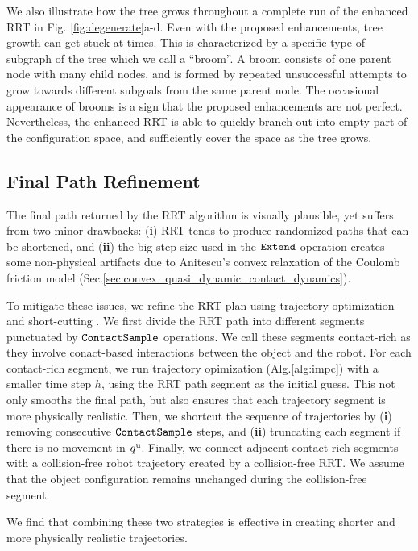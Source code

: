 We also illustrate how the tree grows throughout a complete run of the enhanced RRT in Fig. \ref{fig:degenerate}a-d. Even with the proposed enhancements, tree growth can get stuck at times. This is characterized by a specific type of subgraph of the tree which we call a ``broom''. A broom consists of one parent node with many child nodes, and is formed by repeated unsuccessful attempts to grow towards different subgoals from the same parent node. The occasional appearance of brooms is a sign that the proposed enhancements are not perfect. Nevertheless, the enhanced RRT is able to quickly branch out into empty part of the configuration space, and sufficiently cover the space as the tree grows. 

\subsection{Final Path Refinement}

The final path returned by the RRT algorithm is visually plausible, yet suffers from two minor drawbacks: (\textbf{i}) RRT tends to produce randomized paths that can be shortened, and (\textbf{ii}) the big step size used in the $\mathtt{Extend}$ operation creates some non-physical artifacts due to Anitescu’s convex relaxation of the Coulomb friction model (Sec.\ref{sec:convex_quasi_dynamic_contact_dynamics}). 

To mitigate these issues, we refine the RRT plan using trajectory optimization \cite{lgp,terry} and short-cutting \cite{shortcutting}. 
We first divide the RRT path into different segments punctuated by $\mathtt{ContactSample}$ operations. We call these segments contact-rich as they involve conact-based interactions between the object and the robot. 
For each contact-rich segment, we run trajectory opimization (Alg.\ref{alg:impc}) with a smaller time step $h$, using the RRT path segment as the initial guess. This not only smooths the final path, but also ensures that each trajectory segment is more physically realistic.
Then, we shortcut the sequence of trajectories by (\textbf{i}) removing consecutive $\mathtt{ContactSample}$ steps, and (\textbf{ii}) truncating each segment if there is no movement in ${q^\mathrm{u}}$. 
Finally, we connect adjacent contact-rich segments with a collision-free robot trajectory created by a collision-free RRT. We assume that the object configuration remains unchanged during the collision-free segment.

We find that combining these two strategies is effective in creating shorter and more physically realistic trajectories. 

